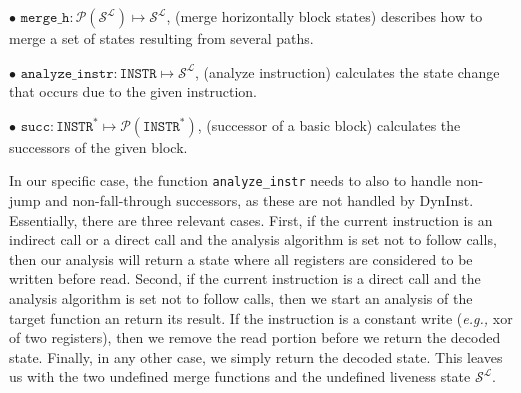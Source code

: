 $\bullet$ $\texttt{merge\_h} : \mathcal{P}(\mathcal{S}^\mathcal{L}) \mapsto \mathcal{S}^\mathcal{L}$, (merge horizontally block states) describes how to merge a set of states resulting from several paths.

$\bullet$ $\texttt{analyze\_instr} : \texttt{INSTR} \mapsto \mathcal{S}^\mathcal{L}$, (analyze instruction) calculates the state change that occurs due to the given instruction.

$\bullet$ $\texttt{succ} : \texttt{INSTR}^* \mapsto \mathcal{P}(\texttt{INSTR}^*)$, (successor of a basic block) calculates the successors of the given block.

In our specific case, the function \texttt{analyze\_instr} needs to also to handle non-jump and non-fall-through successors, as these are not handled by DynInst. 
Essentially, there are three relevant cases.
First, if the current instruction is an indirect call or a direct call and the analysis algorithm is set not to follow calls, 
then our analysis will return a state where all registers are considered to be written before read. Second, if the current instruction is
a direct call and the analysis algorithm is set not to follow calls, 
then we start an analysis of the target function an return its result.
If the instruction is a constant write (\textit{e.g.,} xor of two registers), 
then we remove the read portion before we return the decoded state.
Finally, in any other case, we simply return the decoded state.
This leaves us with the two undefined merge functions and the undefined liveness state $\mathcal{S}^\mathcal{L}$. 

